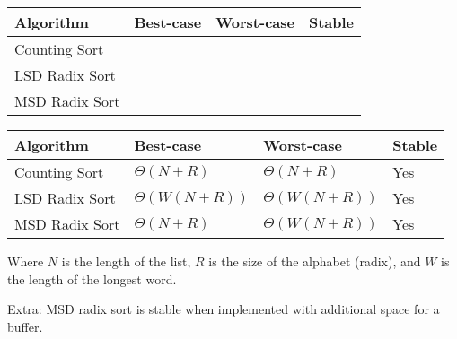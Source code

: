 \ifprintanswers\else
{
\renewcommand{\arraystretch}{2}
\setlength{\tabcolsep}{12pt}
\begin{tabularx}{\textwidth}{Xlll}
Algorithm         & Best-case       & Worst-case          & Stable \\\hline
Counting Sort     &                 &                     &        \\
LSD Radix Sort    &                 &                     &        \\
MSD Radix Sort    &                 &                     &
\end{tabularx}
}
\fi

\begin{solution}
{
\renewcommand{\arraystretch}{2}
\setlength{\tabcolsep}{12pt}
\begin{tabularx}{\textwidth}{Xlll}
Algorithm         & Best-case          & Worst-case          & Stable \\\hline
Counting Sort     & $\Theta(N + R)$    & $\Theta(N + R)$     & Yes    \\
LSD Radix Sort    & $\Theta(W(N + R))$ & $\Theta(W(N + R))$  & Yes    \\
MSD Radix Sort    & $\Theta(N + R)$    & $\Theta(W(N + R))$  & Yes
\end{tabularx}
}

Where $N$ is the length of the list, $R$ is the size of the alphabet (radix),
and $W$ is the length of the longest word.

Extra: MSD radix sort is stable when implemented with additional space for a buffer.
\end{solution}
